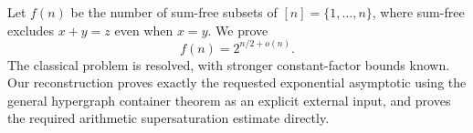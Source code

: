Let $f(n)$ be the number of sum-free subsets of $[n]=\{1,\ldots,n\}$, where sum-free excludes $x+y=z$ even when $x=y$. We prove
\[
 f(n)=2^{n/2+o(n)}.
\]
The classical problem is resolved, with stronger constant-factor bounds known. Our reconstruction proves exactly the requested exponential asymptotic using the general hypergraph container theorem as an explicit external input, and proves the required arithmetic supersaturation estimate directly.
